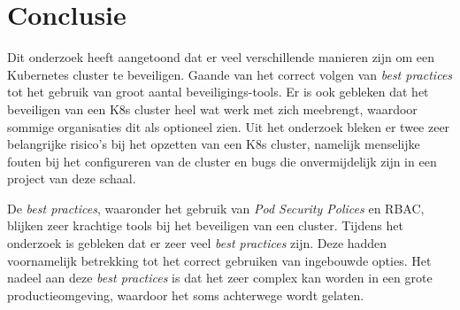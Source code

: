 
\chapter{Conclusie}
\label{ch:conclusie}




	

Dit onderzoek heeft aangetoond dat er veel verschillende manieren zijn om een Kubernetes cluster te beveiligen. Gaande van het correct volgen van \textit{best practices} tot het gebruik van groot aantal beveiligings-tools. Er is ook gebleken dat het beveiligen van een K8s cluster heel wat werk met zich meebrengt, waardoor sommige organisaties dit als optioneel zien. Uit het onderzoek bleken er twee zeer belangrijke risico's bij het opzetten van een K8s cluster, namelijk menselijke fouten bij het configureren van de cluster en bugs die onvermijdelijk zijn in een project van deze schaal.

De \textit{best practices}, waaronder het gebruik van \textit{Pod Security Polices} en RBAC, blijken zeer krachtige tools bij het beveiligen van een cluster. Tijdens het onderzoek is gebleken dat er zeer veel \textit{best practices} zijn. Deze hadden voornamelijk betrekking tot het correct gebruiken van ingebouwde opties. Het nadeel aan deze \textit{best practices} is dat het zeer complex kan worden in een grote productieomgeving, waardoor het soms achterwege wordt gelaten. 

